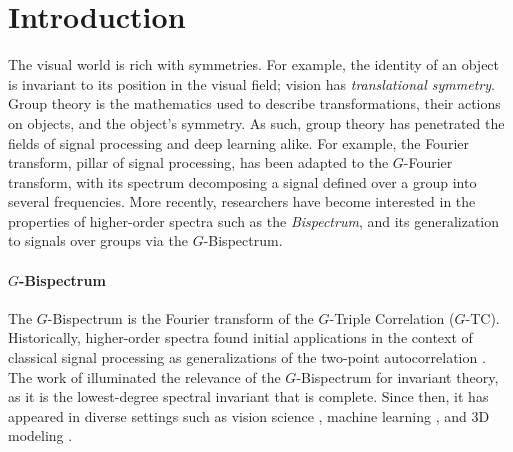 \documentclass{article}
\theoremstyle{plain}
\theoremstyle{definition}
\theoremstyle{remark}
\begin{document}
\section{Introduction}\label{sec:introduction}
The visual world is rich with symmetries. For example, the identity of an object is invariant to its position in the visual field; vision has \textit{translational symmetry}. Group theory is the mathematics used to describe transformations, their actions on objects, and the object's symmetry. As such, group theory has penetrated the fields of signal processing and deep learning alike. For example, the Fourier transform, pillar of signal processing, has been adapted to the $G$-Fourier transform, with its spectrum decomposing a signal defined over a group into several frequencies. More recently, researchers have become interested in the properties of higher-order spectra such as the \textit{Bispectrum}, and its generalization to signals over groups via the $G$-Bispectrum.

\paragraph{$G$-Bispectrum} The $G$-Bispectrum is the Fourier transform of the $G$-Triple Correlation ($G$-TC). Historically, higher-order spectra found initial applications in the context of classical signal processing as generalizations of the two-point autocorrelation \citep{tukey1953spectral, brillinger1991some, nikias1993signal}. The work of \citet{kakarala_thesis} illuminated the relevance of the $G$-Bispectrum for invariant theory, as it is the lowest-degree spectral invariant that is complete. Since then, it has appeared in diverse settings such as vision science \citep{zetzsche2001nonlinear}, machine learning \citep{kondor2007novel, kondor08}, and 3D modeling \citep{kakarala2012Bispectrum}.

\end{document}
